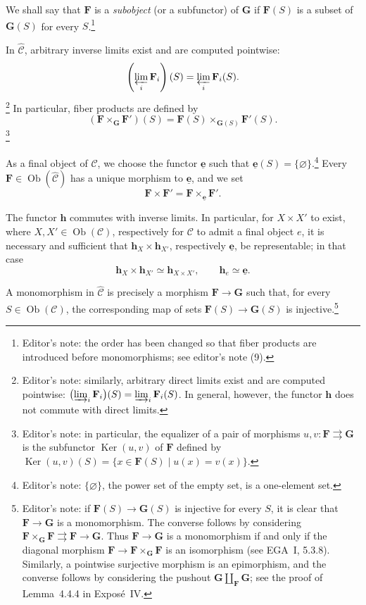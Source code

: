 We shall say that \(\mathbf F\) is a \emph{subobject} (or a subfunctor) of
\(\mathbf G\) if \(\mathbf F(S)\) is a subset of \(\mathbf G(S)\) for every
\(S\).\footnote{Editor's note: the order has been changed so that fiber
products are introduced before monomorphisms; see editor's note (9).}

In \(\widehat{\mathscr C}\), arbitrary inverse limits exist and are computed
pointwise:
\[
  \left(\varprojlim_i\mathbf F_i\right)(S)
    =\varprojlim_i\mathbf F_i(S).
\]
\footnote{Editor's note: similarly, arbitrary direct limits exist and are
computed pointwise:
\(\bigl(\varinjlim_i\mathbf F_i\bigr)(S)=
\varinjlim_i\mathbf F_i(S)\). In general, however, the functor \(\mathbf h\)
does not commute with direct limits.}
In particular, fiber products are defined by
\[
  (\mathbf F\mathbin{\times_{\mathbf G}}\mathbf F')(S)
    =\mathbf F(S)\mathbin{\times_{\mathbf G(S)}}\mathbf F'(S).
\]
\footnote{Editor's note: in particular, the equalizer of a pair of morphisms
\(u,v:\mathbf F\rightrightarrows\mathbf G\) is the subfunctor
\(\operatorname{Ker}(u,v)\) of \(\mathbf F\) defined by
\(\operatorname{Ker}(u,v)(S)=
\{x\in\mathbf F(S)\mid u(x)=v(x)\}\).}

As a final object of \(\widehat{\mathscr C}\), we choose the functor
\(\underline{\mathbf e}\) such that
\(\underline{\mathbf e}(S)=\{\varnothing\}\).\footnote{Editor's note:
\(\{\varnothing\}\), the power set of the empty set, is a one-element set.}
Every \(\mathbf F\in\operatorname{Ob}(\widehat{\mathscr C})\) has a unique
morphism to \(\underline{\mathbf e}\), and we set
\[
  \mathbf F\times\mathbf F'
    =\mathbf F\mathbin{\times_{\underline{\mathbf e}}}\mathbf F'.
\]

The functor \(\mathbf h\) commutes with inverse limits. In particular, for
\(X\times X'\) to exist, where
\(X,X'\in\operatorname{Ob}(\mathscr C)\), respectively for \(\mathscr C\) to
admit a final object \(e\), it is necessary and sufficient that
\(\mathbf h_X\times\mathbf h_{X'}\), respectively
\(\underline{\mathbf e}\), be representable; in that case
\[
  \mathbf h_X\times\mathbf h_{X'}\simeq\mathbf h_{X\times X'},
  \qquad
  \mathbf h_e\simeq\underline{\mathbf e}.
\]

A monomorphism in \(\widehat{\mathscr C}\) is precisely a morphism
\(\mathbf F\to\mathbf G\) such that, for every
\(S\in\operatorname{Ob}(\mathscr C)\), the corresponding map of sets
\(\mathbf F(S)\to\mathbf G(S)\) is injective.\footnote{Editor's note: if
\(\mathbf F(S)\to\mathbf G(S)\) is injective for every \(S\), it is clear
that \(\mathbf F\to\mathbf G\) is a monomorphism. The converse follows by
considering
\(\mathbf F\times_{\mathbf G}\mathbf F\rightrightarrows\mathbf F\to
\mathbf G\). Thus \(\mathbf F\to\mathbf G\) is a monomorphism if and only if
the diagonal morphism
\(\mathbf F\to\mathbf F\times_{\mathbf G}\mathbf F\) is an isomorphism
(see EGA~I, 5.3.8). Similarly, a pointwise surjective morphism is an
epimorphism, and the converse follows by considering the pushout
\(\mathbf G\amalg_{\mathbf F}\mathbf G\); see the proof of Lemma~4.4.4 in
Expos\'e~IV.}

